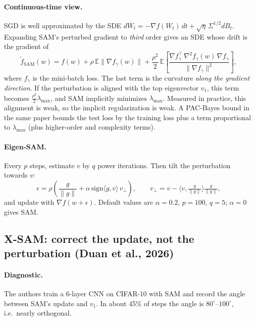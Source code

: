 \documentclass[11pt]{article}
\newcommand{\E}{\mathbb{E}}
\newcommand{\lmax}{\lambda_{\max}}
\theoremstyle{plain}
\begin{document}
\paragraph{Continuous-time view.} SGD is well approximated by the SDE $dW_t = -\nabla f(W_t)\,dt + \sqrt{\eta}\,\Sigma^{1/2} dB_t$.
Expanding SAM's perturbed gradient to \emph{third} order gives an SDE whose drift is the gradient of
\begin{equation}
  \tilde f_{\mathrm{SAM}}(w) = f(w) + \rho\, \E\|\nabla f_\gamma(w)\| + \frac{\rho^2}{2}\, \E\!\left[\frac{\nabla f_\gamma^\top\, \nabla^2 f_\gamma(w)\, \nabla f_\gamma}{\|\nabla f_\gamma\|^2}\right],
\end{equation}
where $f_\gamma$ is the mini-batch loss. The last term is the curvature \emph{along the gradient direction}. If the perturbation is aligned with the top eigenvector $v_1$, this term becomes $\frac{\rho^2}{2}\lmax$,
and SAM implicitly minimizes $\lmax$. Measured in practice, this alignment is weak, so the implicit regularization is weak.
A PAC-Bayes bound in the same paper bounds the test loss by the training loss plus a term proportional to $\lmax$ (plus higher-order and complexity terms).

\paragraph{Eigen-SAM.} Every $p$ steps, estimate $v$ by $q$ power iterations. Then tilt the perturbation towards $v$:
\begin{equation}
  \epsilon = \rho\left(\frac{g}{\|g\|} + \alpha\,\mathrm{sign}\langle g, v\rangle\, v_\perp\right), \qquad v_\perp = v - \Big\langle v, \tfrac{g}{\|g\|}\Big\rangle \tfrac{g}{\|g\|},
\end{equation}
and update with $\nabla f(w + \epsilon)$. Default values are $\alpha = 0.2$, $p = 100$, $q = 5$; $\alpha = 0$ gives SAM.

\subsection{X-SAM: correct the update, not the perturbation (Duan et al., 2026)}

\paragraph{Diagnostic.} The authors train a 6-layer CNN on CIFAR-10 with SAM and record the angle between SAM's update and $v_1$.
In about 45\% of steps the angle is $80^\circ$--$100^\circ$, i.e.\ nearly orthogonal.
\end{document}
